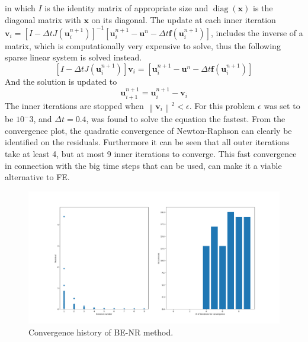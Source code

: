\documentclass{article}
\newcommand{\norm}[1]{\left\lVert#1\right\rVert}
\begin{document}
in which $I$ is the identity matrix of appropriate size and $\operatorname{diag}(\mathbf{x})$ is the diagonal matrix with $\mathbf{x}$ on its diagonal. The update at each inner iteration $\mathbf{v}_i = \left[I-\Delta t J\left(\mathbf{u}_{i}^{n+1}\right)\right]^{-1}\left[\mathbf{u}_{i}^{n+1}-\mathbf{u}^{n}-\Delta t \mathbf{f}\left(\mathbf{u}_{i}^{n+1}\right)\right]$, includes the inverse of a matrix, which is computationally very expensive to solve, thus the following sparse linear system is solved instead.
\begin{equation}
\left[I-\Delta t J\left(\mathbf{u}_{i}^{n+1}\right)\right] \mathbf{v}_i = \left[\mathbf{u}_{i}^{n+1}-\mathbf{u}^{n}-\Delta t \mathbf{f}\left(\mathbf{u}_{i}^{n+1}\right)\right]
\end{equation}
And the solution is updated to
\begin{equation}
	\mathbf{u}^{n+1}_{i+1} = 	\mathbf{u}^{n+1}_{i} - \mathbf{v}_i
\end{equation}
The inner iterations are stopped when $\norm{\mathbf{v}_i}^2 < \epsilon$.
For this problem $\epsilon$ was set to be $10^-3$, and $\Delta t = 0.4$, was found to solve the equation the fastest. From the convergence plot, the quadratic convergence of Newton-Raphson can clearly be identified on the residuals. Furthermore it can be seen that all outer iterations take at least 4, but at most 9 inner iterations to converge. This fast convergence in connection with the big time steps that can be used, can make it a viable alternative to FE.
\begin{figure}[H]
	\centering
	\includegraphics[width=.9\linewidth]{4ConvergenceNewton.png}
	\caption{Convergence history of BE-NR method.}
\end{figure}
\end{document}
